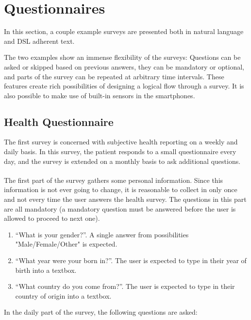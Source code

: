 \section{Questionnaires}
\label{sec:questionnaires}
In this section, a couple example surveys are presented both in natural language and DSL adherent text.
 
The two examples show an immense flexibility of the surveys: Questions can be asked or skipped based on previous answers, they can be mandatory or optional, and parts of the survey can be repeated at arbitrary time intervals. These features create rich possibilities of designing a logical flow through a survey. It is also possible to make use of built-in sensors in the smartphones.

\subsection{Health Questionnaire}
\label{subsec:healthquestionnaire}
The first survey is concerned with subjective health reporting on a weekly and daily basis. In this survey, the patient responds to a small questionnaire every day, and the survey is extended on a monthly basis to ask additional questions.\\\\
The first part of the survey gathers some personal information. Since this information is not ever going to change, it is reasonable to collect in only once and not every time the user answers the health survey. The questions in this part are all mandatory (a mandatory question must be answered before the user is allowed to proceed to next one).

\begin{enumerate}
\item ``What is your gender?''. A single answer from possibilities "Male/Female/Other" is expected.
\item ``What year were your born in?''. The user is expected to type in their year of birth into a textbox.
\item ``What country do you come from?''. The user is expected to type in their country of origin into a textbox.
\end{enumerate}

In the daily part of the survey, the following questions are asked: 

